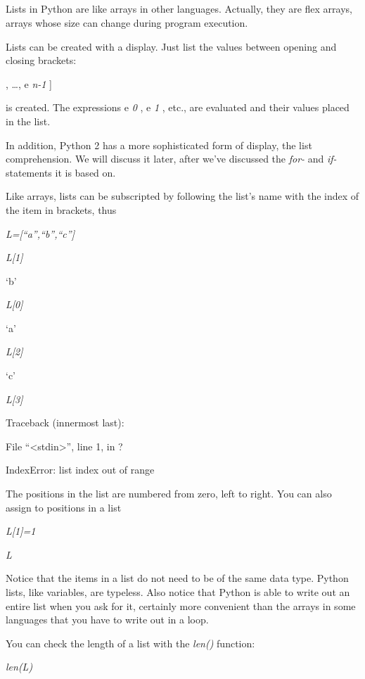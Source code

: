 \subsection[Lists]{}

Lists in Python are like arrays in
other languages. Actually, they are flex arrays, arrays whose size can
change during program execution.

Lists can be created with a
display. Just list the values between opening and closing brackets:

 ,
\ldots{}, e \emph{n-1} {]}

 is
created. The expressions e \emph{0} , e \emph{1} , etc., are evaluated
and their values placed in the list.

In addition, Python 2 has a more
sophisticated form of display, the list comprehension. We will discuss
it later, after we've discussed the \emph{for-} and \emph{if-}
statements it is based on.

Like arrays, lists can be
subscripted by following the list's name with the index of the item in
brackets, thus


\emph{L={[}``a'',``b'',``c''{]}}


\emph{L{[}1{]}}

`b'


\emph{L{[}0{]}}

`a'


\emph{L{[}2{]}}

`c'


\emph{L{[}3{]}}

Traceback (innermost last):

 File
``\textless{}stdin\textgreater{}'', line 1, in ?

IndexError: list index out of range

The positions in the list are
numbered from zero, left to right. You can also assign to positions in a
list


\emph{L{[}1{]}=1}


\emph{L}



Notice that the items in a list do
not need to be of the same data type. Python lists, like variables, are
typeless. Also notice that Python is able to write out an entire list
when you ask for it, certainly more convenient than the arrays in some
languages that you have to write out in a loop.

You can check the length of a list
with the \emph{len()} function:


\emph{len(L)}

